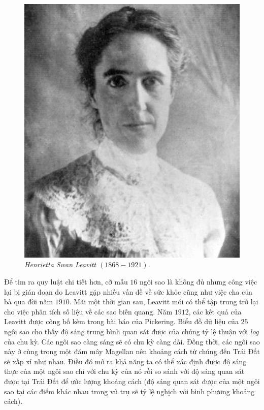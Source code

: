 \begin{multicols}{2}
	\begin{figure}[H]
		\vspace*{-5pt}
		\centering
		\captionsetup{labelformat= empty, justification=centering}
		\includegraphics[width= 0.7\linewidth]{4}
		\caption{\small\textit{\color{timhieukhoahoc}Henrietta Swan Leavitt $(1868 - 1921)$.}}
		\vspace*{-5pt}
	\end{figure}
	Để tìm ra quy luật chi tiết hơn, cỡ mẫu $16$ ngôi sao là không đủ nhưng công việc lại bị gián đoạn do Leavitt gặp nhiều vấn đề về sức khỏe cũng như việc cha của bà qua đời năm $1910$. Mãi một thời gian sau, Leavitt mới có thể tập trung trở lại cho việc phân tích số liệu về các sao biến quang. 
	\vskip 0.1cm
	Năm $1912$, các kết quả của Leavitt được công bố kèm trong bài báo của Pickering. Biểu đồ dữ liệu của $25$ ngôi sao cho thấy độ sáng trung bình quan sát được của chúng tỷ lệ thuận với \textit{log} của chu kỳ. Các ngôi sao càng sáng sẽ có chu kỳ càng dài. Đồng thời, các ngôi sao này ở cùng trong một đám mây Magellan nên khoảng cách từ chúng đến Trái Đất sẽ xấp xỉ như nhau. Điều đó mở ra khả năng ta có thể xác định được độ sáng thực của một ngôi sao chỉ với chu kỳ của nó rồi so sánh với độ sáng quan sát được tại Trái Đất để ước lượng khoảng cách (độ sáng quan sát được của một ngôi sao tại các điểm khác nhau trong vũ trụ sẽ tỷ lệ nghịch với bình phương khoảng cách). 
	\begin{figure}[H]
		\vspace*{-5pt}
		\centering
		\captionsetup{labelformat= empty, justification=centering}

\end{figure}
\end{multicols}
